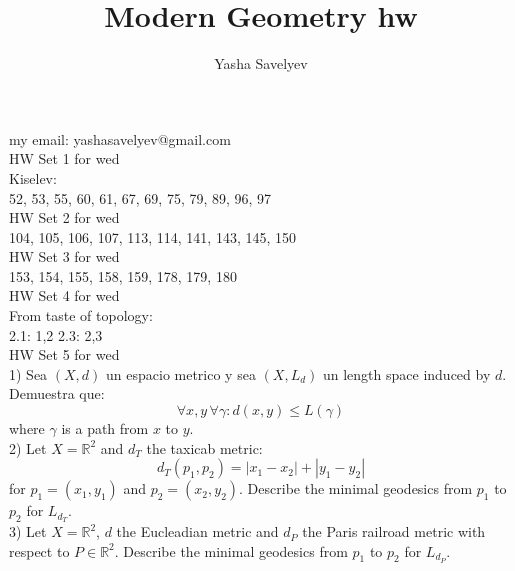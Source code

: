 \documentclass{amsart}
\numberwithin{equation}{section}
\theoremstyle{definition}
\theoremstyle{remark}
\begin{document}
\title{Modern Geometry hw}
\author{Yasha Savelyev}
\address{University of Colima}
\maketitle
my email: yashasavelyev@gmail.com
\\

HW Set 1 for wed
\\

Kiselev: 
\\

52, 53, 55, 60, 61, 67, 69, 75, 79, 89, 96, 97
\\

HW Set 2 for wed
\\

104, 105, 106, 107, 113, 114, 141, 143, 145, 150
\\

HW Set 3 for wed
\\

153, 154, 155, 158, 159, 178, 179, 180
\\


HW Set 4 for wed
\\


From taste of topology:
\\

2.1: 1,2 
2.3: 2,3 
\\


HW Set 5 for wed
\\

1) Sea $(X, d) $ un espacio metrico y sea $(X, L _{d})$ un length space induced by $d$. Demuestra que: $$\forall x,y \, \forall \gamma: d (x,y) \leq L (\gamma)$$ where $\gamma$  is a path from $x$ to $y$. 
\\

2) Let $X = \mathbb{R} ^{2}$ and $d _{T}$ the taxicab metric:
$$d _{T} (p _{1}, p _{2}) = |x _{1} - x _{2}| + |y _{1} - y _{2}|$$ for $p _{1} = (x _{1}, y _{1}) $ and $p _{2} = (x _{2}, y _{2})$.
Describe the minimal geodesics from $p _{1}$ to $p _{2}$ for $L _{d _{T}}$. 
\\

3) Let $X = \mathbb{R} ^{2}$, $d$  the Eucleadian metric and $d _{P}$ the Paris railroad metric with respect to $P \in \mathbb{R} ^{2}$. Describe the minimal geodesics from $p _{1}$  to $p _{2}$ for $L _{d _{P}}$. 
\\
\end{document}
